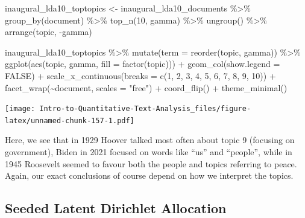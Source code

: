 \documentclass[
]{article}
\newenvironment{Shaded}{\begin{snugshade}}{\end{snugshade}}
\newcommand{\AttributeTok}[1]{\textcolor[rgb]{0.77,0.63,0.00}{#1}}
\newcommand{\ConstantTok}[1]{\textcolor[rgb]{0.00,0.00,0.00}{#1}}
\newcommand{\DecValTok}[1]{\textcolor[rgb]{0.00,0.00,0.81}{#1}}
\newcommand{\FunctionTok}[1]{\textcolor[rgb]{0.00,0.00,0.00}{#1}}
\newcommand{\NormalTok}[1]{#1}
\newcommand{\OtherTok}[1]{\textcolor[rgb]{0.56,0.35,0.01}{#1}}
\newcommand{\SpecialCharTok}[1]{\textcolor[rgb]{0.00,0.00,0.00}{#1}}
\newcommand{\StringTok}[1]{\textcolor[rgb]{0.31,0.60,0.02}{#1}}
\begin{document}
\begin{Shaded}
\begin{Highlighting}[]
\NormalTok{inaugural\_lda10\_toptopics }\OtherTok{\textless{}{-}}\NormalTok{ inaugural\_lda10\_documents }\SpecialCharTok{\%\textgreater{}\%}
    \FunctionTok{group\_by}\NormalTok{(document) }\SpecialCharTok{\%\textgreater{}\%}
    \FunctionTok{top\_n}\NormalTok{(}\DecValTok{10}\NormalTok{, gamma) }\SpecialCharTok{\%\textgreater{}\%}
    \FunctionTok{ungroup}\NormalTok{() }\SpecialCharTok{\%\textgreater{}\%}
    \FunctionTok{arrange}\NormalTok{(topic, }\SpecialCharTok{{-}}\NormalTok{gamma)}

\NormalTok{inaugural\_lda10\_toptopics }\SpecialCharTok{\%\textgreater{}\%}
    \FunctionTok{mutate}\NormalTok{(}\AttributeTok{term =} \FunctionTok{reorder}\NormalTok{(topic, gamma)) }\SpecialCharTok{\%\textgreater{}\%}
    \FunctionTok{ggplot}\NormalTok{(}\FunctionTok{aes}\NormalTok{(topic, gamma, }\AttributeTok{fill =} \FunctionTok{factor}\NormalTok{(topic))) }\SpecialCharTok{+} \FunctionTok{geom\_col}\NormalTok{(}\AttributeTok{show.legend =} \ConstantTok{FALSE}\NormalTok{) }\SpecialCharTok{+}
    \FunctionTok{scale\_x\_continuous}\NormalTok{(}\AttributeTok{breaks =} \FunctionTok{c}\NormalTok{(}\DecValTok{1}\NormalTok{, }\DecValTok{2}\NormalTok{, }\DecValTok{3}\NormalTok{, }\DecValTok{4}\NormalTok{, }\DecValTok{5}\NormalTok{, }\DecValTok{6}\NormalTok{, }\DecValTok{7}\NormalTok{, }\DecValTok{8}\NormalTok{, }\DecValTok{9}\NormalTok{, }\DecValTok{10}\NormalTok{)) }\SpecialCharTok{+} \FunctionTok{facet\_wrap}\NormalTok{(}\SpecialCharTok{\textasciitilde{}}\NormalTok{document,}
    \AttributeTok{scales =} \StringTok{"free"}\NormalTok{) }\SpecialCharTok{+} \FunctionTok{coord\_flip}\NormalTok{() }\SpecialCharTok{+} \FunctionTok{theme\_minimal}\NormalTok{()}
\end{Highlighting}
\end{Shaded}

\texttt{[image: Intro-to-Quantitative-Text-Analysis\_files/figure-latex/unnamed-chunk-157-1.pdf]}

Here, we see that in 1929 Hoover talked most often about topic 9 (focusing on government), Biden in 2021 focused on words like ``us'' and ``people'', while in 1945 Roosevelt seemed to favour both the people and topics referring to peace. Again, our exact conclusions of course depend on how we interpret the topics.

\hypertarget{seeded-latent-dirichlet-allocation}{%
\subsection{Seeded Latent Dirichlet Allocation}\label{seeded-latent-dirichlet-allocation}}
\end{document}
